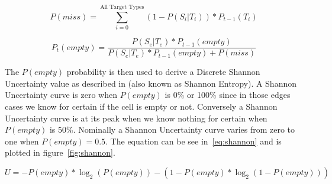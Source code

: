 \begin{multicols*}{2}
\begin{equation}
\label{eq:bayesianEmptyDenom}
P(miss) = \sum_{i=0}^{\text{All Target Types}} (1 - P(S_{i}|T_{i})) * P_{t-1}(T_{i})
\end{equation}

\begin{equation}
\label{eq:bayesianEmpty}
P_{t}(empty) = \frac{P(S_{e}|T_{e})*P_{t-1}(empty)}{ P(S_{e}|T_{e})*P_{t-1}(empty) + P(miss)}
\end{equation}

The $P(empty)$ probability is then used to derive a Discrete Shannon Uncertainty value as described in \cite{shannon} (also known as Shannon Entropy).  A Shannon Uncertainty curve is zero when $P(empty)$ is 0\% or 100\% since in those edges cases we know for certain if the cell is empty or not.  Conversely a Shannon Uncertainty curve is at its peak when we know nothing for certain when $P(empty)$ is 50\%.  Nominally a Shannon Uncertainty curve varies from zero to one when $P(empty) = 0.5$. The equation can be see in~\ref{eq:shannon} and is plotted in figure~\ref{fig:shannon}.

\end{multicols*}

\begin{equation}
\label{eq:shannon}
U = -P(empty) * \log_{2}(P(empty)) - ( 1-P(empty) * \log_{2}(1-P(empty)))
\end{equation}

